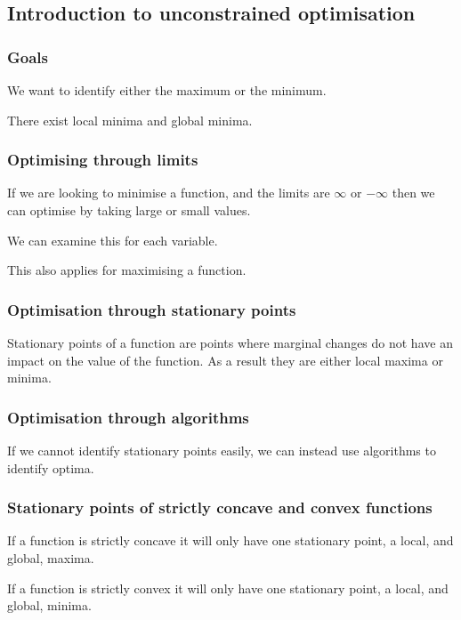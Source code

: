 
\subsection{Introduction to unconstrained optimisation}

\subsubsection{Goals}

We want to identify either the maximum or the minimum.

There exist local minima and global minima.

\subsubsection{Optimising through limits}

If we are looking to minimise a function, and the limits are \(\infty \) or \(-\infty \) then we can optimise by taking large or small values.

We can examine this for each variable.

This also applies for maximising a function.

\subsubsection{Optimisation through stationary points}

Stationary points of a function are points where marginal changes do not have an impact on the value of the function. As a result they are either local maxima or minima.

\subsubsection{Optimisation through algorithms}

If we cannot identify stationary points easily, we can instead use algorithms to identify optima.

\subsubsection{Stationary points of strictly concave and convex functions}

If a function is strictly concave it will only have one stationary point, a local, and global, maxima.

If a function is strictly convex it will only have one stationary point, a local, and global, minima.

